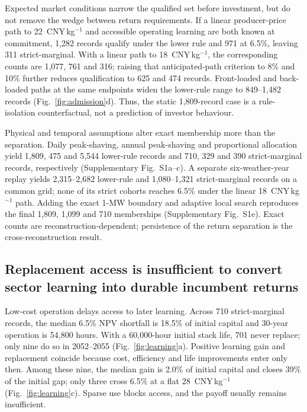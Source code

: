 \documentclass[11pt,a4paper]{article}
\newcommand{\cnykg}{CNY\,kg$^{-1}$}
\begin{document}
Expected market conditions narrow the qualified set before investment, but do not remove the wedge between return requirements. If a linear producer-price path to 22~\cnykg{} and accessible operating learning are both known at commitment, 1,282 records qualify under the lower rule and 971 at 6.5\%, leaving 311 strict-marginal. With a linear path to 18~\cnykg{}, the corresponding counts are 1,077, 761 and 316; raising that anticipated-path criterion to 8\% and 10\% further reduces qualification to 625 and 474 records. Front-loaded and back-loaded paths at the same endpoints widen the lower-rule range to 849--1,482 records (Fig.~\ref{fig:admission}d). Thus, the static 1,809-record case is a rule-isolation counterfactual, not a prediction of investor behaviour.

Physical and temporal assumptions alter exact membership more than the separation. Daily peak-shaving, annual peak-shaving and proportional allocation yield 1,809, 475 and 5,544 lower-rule records and 710, 329 and 390 strict-marginal records, respectively (Supplementary Fig.~S1a--c). A separate six-weather-year replay yields 2,315--2,682 lower-rule and 1,080--1,321 strict-marginal records on a common grid; none of its strict cohorts reaches 6.5\% under the linear 18~\cnykg{} path. Adding the exact 1-MW boundary and adaptive local search reproduces the final 1,809, 1,099 and 710 memberships (Supplementary Fig.~S1e). Exact counts are reconstruction-dependent; persistence of the return separation is the cross-reconstruction result.

\subsection*{Replacement access is insufficient to convert sector learning into durable incumbent returns}

Low-cost operation delays access to later learning. Across 710 strict-marginal records, the median 6.5\% NPV shortfall is 18.5\% of initial capital and 30-year operation is 54,800 hours. With a 60,000-hour initial stack life, 701 never replace; only nine do so in 2052--2055 (Fig.~\ref{fig:learning}a). Positive learning gain and replacement coincide because cost, efficiency and life improvements enter only then. Among these nine, the median gain is 2.0\% of initial capital and closes 39\% of the initial gap; only three cross 6.5\% at a flat 28~\cnykg{} (Fig.~\ref{fig:learning}c). Sparse use blocks access, and the payoff usually remains insufficient.
\end{document}
